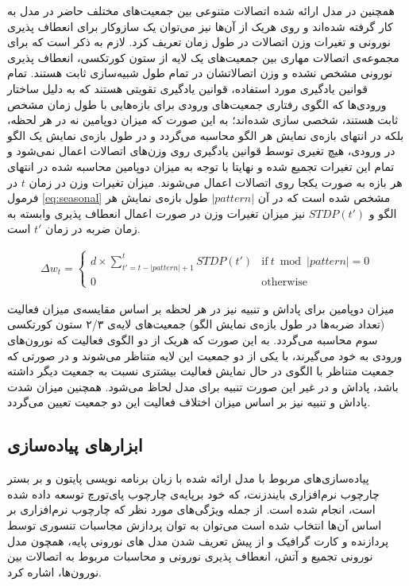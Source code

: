 \documentclass[12pt]{report}
\begin{document}
	همچنین در مدل ارائه شده اتصالات متنوعی بین جمعیت‌های مختلف حاضر در مدل به کار گرفته شده‌اند و روی هریک از آن‌ها نیز می‌توان یک سازوکار برای انعطاف پذیری نورونی و تغیرات وزن اتصالات در طول زمان تعریف کرد. لازم به ذکر است که برای مجموعه‌ی اتصالات مهاری بین جمعیت‌های یک لایه از ستون کورتکسی، انعطاف پذیری نورونی مشخص نشده و وزن اتصالاتشان در تمام طول شبیه‌سازی ثابت هستند. تمام قوانین یادگیری مورد استفاده، قوانین یادگیری تقویتی هستند که به دلیل ساختار ورودی‌ها که الگوی رفتاری جمعیت‌های ورودی برای بازه‌هایی با طول زمان مشخص ثابت هستند، شخصی سازی شده‌اند؛ به این صورت که میزان دوپامین نه در هر لحظه، بلکه در انتهای بازه‌ی نمایش هر الگو محاسبه می‌گردد و در طول بازه‌ی نمایش یک الگو در ورودی، هیچ تغیری توسط قوانین یادگیری روی وزن‌های اتصالات اعمال نمی‌شود و تمام این تغیرات تجمیع شده و نهایتا با توجه به میزان دوپامین محاسبه شده در انتهای هر بازه به صورت یکجا روی اتصالات اعمال می‌شوند. میزان تغیرات وزن در زمان $t$ در فرمول \ref{eq:seasonal} مشخص شده است که در آن $|pattern|$ طول بازه‌ی نمایش هر الگو و $STDP(t')$ نیز میزان تغیرات وزن در صورت اعمال انعطاف پذیری وابسته به زمان ضربه در زمان $t'$ است.
	
	\begin{align}
		\Delta w_t =
		\begin{cases}
			d \times \sum_{t'=t-\left | pattern \right |+1}^{t} STDP(t') & \text{if}~t\bmod\left | pattern \right | = 0\\
			0 & \text{otherwise}
		\end{cases}  
		\label{eq:seasonal}
	\end{align}
	
	میزان دوپامین برای پاداش و تنبیه نیز در هر لحظه بر اساس مقایسه‌ی میزان فعالیت (تعداد ضربه‌ها در طول بازه‌ی نمایش الگو) جمعیت‌های لایه‌ی ۲/۳ ستون کورتکسی سوم محاسبه می‌گردد. به این صورت که هریک از دو الگوی فعالیت که نورون‌های ورودی به خود می‌گیرند، با یکی از دو جمعیت این لایه متناظر می‌شوند و در صورتی که جمعیت متناظر با الگوی در حال نمایش فعالیت بیشتری نسبت به جمعیت دیگر داشته باشد، پاداش و در غیر این صورت تنبیه برای مدل لحاظ می‌شود. همچنین میزان شدت پاداش و تنبیه نیز بر اساس میزان اختلاف فعالیت این دو جمعیت تعیین می‌گردد.
	
	

	\subsection{ابزار‌های پیاده‌سازی}
	
	پیاده‌سازی‌های مربوط با مدل ارائه شده با زبان برنامه نویسی پایتون و بر بستر چارچوب نرم‌افزاری بایندزنت، که خود برپایه‌ی چارچوب پای‌تورچ توسعه داده شده است، انجام شده است. از جمله ویژگی‌های مورد نظر که چارچوب نرم‌افزاری بر اساس آن‌ها انتخاب شده است می‌توان به توان پردازش مجاسبات تنسوری توسط پردازنده و کارت گرافیک و از پیش تعریف شدن مدل های نورونی پایه، همچون مدل نورونی تجمیع و آتش، انعطاف پذیری نورونی و محاسبات مربوط به اتصالات بین نورون‌ها، اشاره کرد.
	
\end{document}
